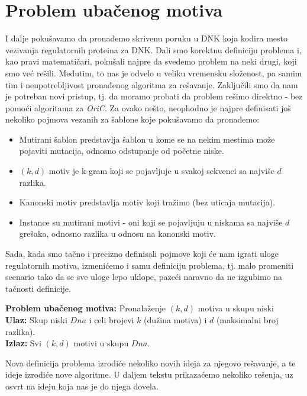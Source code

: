 \section{Problem ubačenog motiva}

I dalje pokušavamo da pronađemo skrivenu poruku u DNK koja kodira mesto vezivanja regulatornih proteina za DNK. Dali smo korektnu definiciju problema i, kao pravi matematičari, pokušali najpre da svedemo problem na neki drugi, koji smo već rešili. Međutim, to nas je odvelo u veliku vremensku složenost, pa samim tim i neupotrebljivost pronađenog algoritma za rešavanje. Zaključili smo da nam je potreban novi pristup, tj. da moramo probati da problem rešimo direktno - bez pomoći algoritama za \textit{OriC}. Za ovako nešto, neophodno je najpre definisati još nekoliko pojmova vezanih za šablone koje pokušavamo da pronađemo:

\begin{itemize}
    \item Mutirani šablon predstavlja šablon u kome se na nekim mestima može pojaviti mutacija, odnosno odstupanje od početne niske.
    \item $(k, d)$ motiv je k-gram koji se pojavljuje u svakoj sekvenci sa najviše $d$ razlika.
    \item Kanonski motiv predstavlja motiv koji tražimo (bez uticaja mutacija).
    \item Instance su mutirani motivi - oni koji se pojavljuju u niskama sa najviše $d$ grešaka, odnosno razlika u odnosu na kanonski motiv.
\end{itemize}

Sada, kada smo tačno i precizno definisali pojmove koji će nam igrati uloge regulatornih motiva, izmenićemo i samu definiciju problema, tj. malo promeniti scenario tako da se sve uloge lepo uklope, pazeći naravno da ne izgubimo na tačnosti definicije.

\begin{tcolorbox}
\textbf{Problem ubačenog motiva:} Pronalaženje $(k, d)$ motiva u skupu niski\\
\textbf{Ulaz:} Skup niski $Dna$ i celi brojevi $k$ (dužina motiva) i $d$ (maksimalni broj razlika).\\
\textbf{Izlaz:} Svi $(k, d)$ motivi u skupu $Dna$.
\end{tcolorbox}

Nova definicija problema izrodiće nekoliko novih ideja za njegovo rešavanje, a te ideje izrodiće nove algoritme. U daljem tekstu prikazaćemo nekoliko rešenja, uz osvrt na ideju koja nas je do njega dovela.


